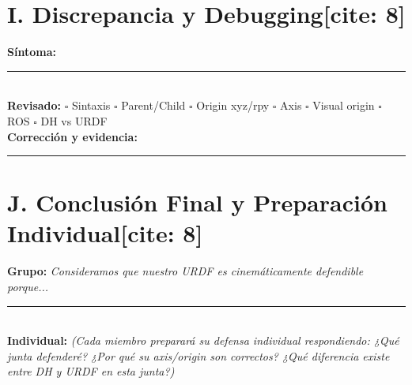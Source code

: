 \documentclass[11pt, a4paper]{article}
\begin{document}
\section*{I. Discrepancia y Debugging[cite: 8]}
\textbf{Síntoma:} \rule{12cm}{0.15mm} \\
\textbf{Revisado:} $\square$ Sintaxis $\square$ Parent/Child $\square$ Origin xyz/rpy $\square$ Axis $\square$ Visual origin $\square$ ROS $\square$ DH vs URDF \\
\textbf{Corrección y evidencia:} \rule{12cm}{0.15mm}

\section*{J. Conclusión Final y Preparación Individual[cite: 8]}
\textbf{Grupo:} \textit{Consideramos que nuestro URDF es cinemáticamente defendible porque...} \rule{5cm}{0.15mm} \\
\textbf{Individual:} \textit{(Cada miembro preparará su defensa individual respondiendo: ¿Qué junta defenderé? ¿Por qué su axis/origin son correctos? ¿Qué diferencia existe entre DH y URDF en esta junta?)}
\end{document}
